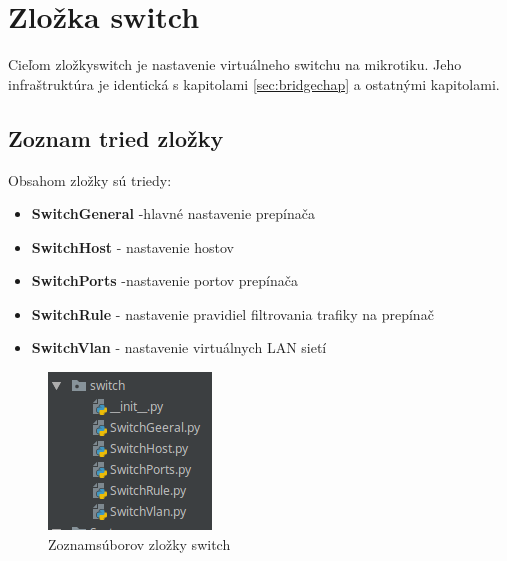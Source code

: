 \section{Zložka switch}
Cieľom zložkyswitch je nastavenie virtuálneho switchu na mikrotiku. Jeho infraštruktúra je identická s kapitolami \ref{sec:bridgechap} a ostatnými kapitolami. 
\subsection{Zoznam tried zložky}
Obsahom zložky sú triedy:
\begin{itemize}
\item \textbf{SwitchGeneral} -hlavné nastavenie prepínača
\item \textbf{SwitchHost} - nastavenie hostov
\item \textbf{SwitchPorts} -nastavenie portov prepínača
\item \textbf{SwitchRule} - nastavenie pravidiel filtrovania trafiky na prepínač
\item \textbf{SwitchVlan} - nastavenie virtuálnych LAN sietí
\end{itemize}
\begin{figure}[H]
\centering
\includegraphics[scale=0.8]{../text/switch.png}
\caption{Zoznamsúborov zložky switch}
\label{fig:switch}
\end{figure}
